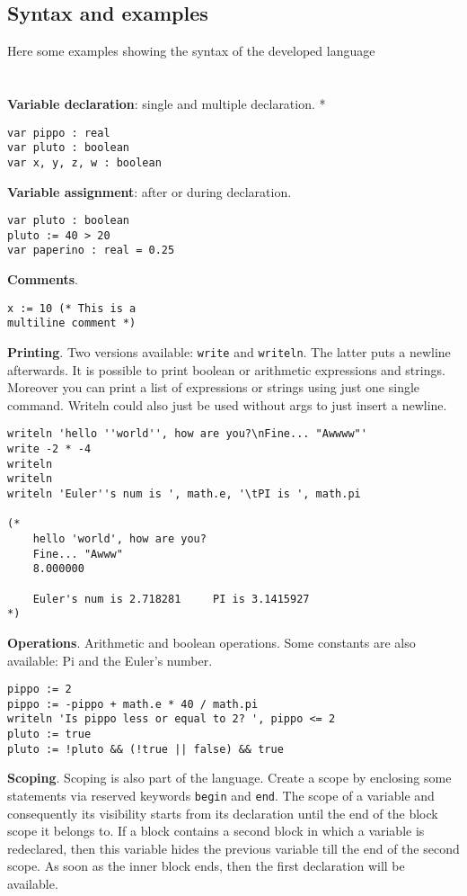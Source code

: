 \documentclass[12pt]{article}
\begin{document}
\subsection{Syntax and examples}
Here some examples showing the syntax of the developed language\\\\\\
\textbf{Variable declaration}: single and multiple declaration. *
\begin{lstlisting}[frame=single]
var pippo : real
var pluto : boolean
var x, y, z, w : boolean
\end{lstlisting}
\pagebreak
\textbf{Variable assignment}: after or during declaration.
\begin{lstlisting}[frame=single]
var pluto : boolean
pluto := 40 > 20
var paperino : real = 0.25
\end{lstlisting}
\vspace{1.8cm}
\textbf{Comments}.
\begin{lstlisting}[frame=single]
x := 10 (* This is a
multiline comment *)
\end{lstlisting}
\vspace{1.8cm}
\textbf{Printing}. Two versions available: \texttt{write} and \texttt{writeln}. The latter puts a newline afterwards. It is possible to print boolean or arithmetic expressions and strings. Moreover you can print a list of expressions or strings using just one single command. Writeln could also just be used without args to just insert a newline.
\vspace{0.1cm}
\begin{lstlisting}[frame=single]
writeln	'hello ''world'', how are you?\nFine... "Awwww"'
write -2 * -4
writeln
writeln
writeln 'Euler''s num is ', math.e, '\tPI is ', math.pi

(*
	hello 'world', how are you?
	Fine... "Awww"
	8.000000
	
	Euler's num is 2.718281     PI is 3.1415927
*)
\end{lstlisting}
\vspace{2cm}
\textbf{Operations}. Arithmetic and boolean operations. Some constants are also available: Pi and the Euler's number.
\begin{lstlisting}[frame=single]
pippo := 2
pippo := -pippo + math.e * 40 / math.pi
writeln 'Is pippo less or equal to 2? ', pippo <= 2 
pluto := true
pluto := !pluto && (!true || false) && true
\end{lstlisting}
\vspace{2cm}
\textbf{Scoping}. Scoping is also part of the language. Create a scope by enclosing some statements via reserved keywords \texttt{begin} and \texttt{end}. The scope of a variable and consequently its visibility starts from its declaration until the end of the block scope it belongs to. If a block contains a second block in which a variable is redeclared, then this variable hides the previous variable till the end of the second scope. As soon as the inner block ends, then the first declaration will be available.
\end{document}

